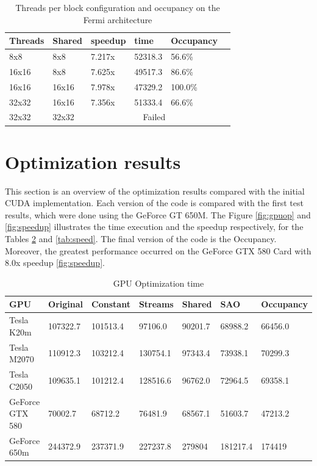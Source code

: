 \begin{table}[h]
\centering
  \begin{tabular} { | l | l | l | l | l | l | }
    \hline
    Threads & Shared & speedup & time & Occupancy \\
    \hline
     8x8 &  8x8 & 7.217x & 52318.3  & 56.6\% \\
    \hline
     16x16 & 8x8 & 7.625x & 49517.3 & 86.6\% \\
    \hline
    16x16 & 16x16 & 7.978x & 47329.2 & 100.0\% \\
    \hline
    32x32 & 16x16 & 7.356x & 51333.4 & 66.6\% \\
    \hline
    32x32 & 32x32 & \multicolumn{3}{|c|}{Failed}\\
    \hline
  \end{tabular}
  \caption{Threads per block configuration and occupancy on the Fermi architecture}
  \label{tab:ocu}
  \end{table}


\section{Optimization results}

This section is an overview of the optimization results compared with the initial CUDA implementation. Each version of the code is compared with the first test results, which were done using the GeForce GT 650M. The Figure \ref{fig:gpuop} and \ref{fig:speedup} illustrates the time execution and the speedup respectively, for the Tables \ref{tab:time} and \ref{tab:speed}. The final version of the code is the Occupancy. Moreover, the greatest performance occurred on the GeForce GTX 580 Card with 8.0x speedup \ref{fig:speedup}.

\begin{table}[h]
\centering
  \begin{tabular} { |  l  |  l | l  |  l  | l | l | l |}
    \hline
    GPU & Original & Constant & Streams & Shared & SAO & Occupancy \\
    \hline
    Tesla K20m & 107322.7 & 101513.4 & 97106.0 & 90201.7 & 68988.2 & 66456.0\\
   \hline
    Tesla M2070 & 110912.3 & 103212.4 & 130754.1 & 97343.4 & 73938.1 & 70299.3\\
    \hline
    Tesla C2050 & 109635.1 & 101212.4 & 128516.6 & 96762.0 & 72964.5 & 69358.1\\
   \hline
    GeForce GTX 580 & 70002.7 & 68712.2 & 76481.9 & 68567.1 & 51603.7 & 47213.2\\
   \hline
    GeForce 650m & 244372.9 & 237371.9 & 227237.8 & 279804 & 181217.4 & 174419\\
   \hline
  \end{tabular}
    \caption{GPU Optimization time}
  \label{tab:time}
  \end{table}
  
